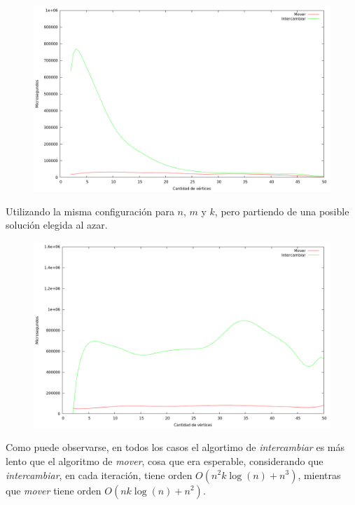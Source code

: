 \begin{figure}[H]
  \begin{center}
    \includegraphics[scale=0.35]{imagenes/local-goloso-k-tiempo.png}
  \end{center}
\end{figure}

Utilizando la misma configuración para $n$, $m$ y $k$, pero partiendo de una
posible solución elegida al azar.

\begin{figure}[H]
  \begin{center}
    \includegraphics[scale=0.35]{imagenes/local-random-k-tiempo.png}
  \end{center}
\end{figure}

Como puede observarse, en todos los casos el algortimo de \textit{intercambiar}
es más lento que el algoritmo de \textit{mover}, cosa que era esperable,
considerando que \textit{intercambiar}, en cada iteración, tiene orden
$O(n^2k\log(n) + n^3)$, mientras que \textit{mover} tiene orden $O(nk\log(n) +
n^2)$.

